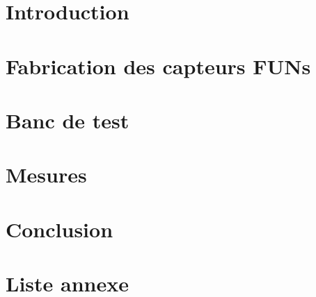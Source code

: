 \documentclass[
    iai & comatec, %
    mi, %
]{heig-tb}
\begin{document}
\maketitle
\frontmatter
\clearemptydoublepage

\preamble
\authentification

\begin{abstract}
    
\end{abstract}

\clearemptydoublepage
{
    \tableofcontents
    \let\cleardoublepage\clearpage
    \listoffigures
    \let\cleardoublepage\clearpage
    \listoftables
    \let\cleardoublepage\clearpage
    \listoflistings
}

\printnomenclature
\clearemptydoublepage
{}

\label{glossaire}
\printnoidxglossary

\mainmatter
\chapter{Introduction}

%

\chapter{Fabrication des capteurs FUNs}


\chapter{Banc de test}


\chapter{Mesures}


\chapter{Conclusion}


\clearpage

\printbibliography

\appendix
\appendixpage
\addappheadtotoc

\chapter{Liste annexe}
\end{document}
